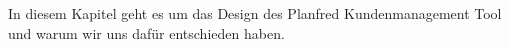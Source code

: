 In diesem Kapitel geht es um das Design des Planfred Kundenmanagement Tool und warum wir uns dafür entschieden haben.
